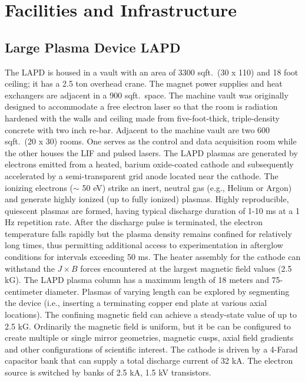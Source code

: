 \documentclass[11pt]{article}
\date{}
\title{}
\begin{document}
\section{Facilities and Infrastructure}

\subsection{Large Plasma Device {LAPD}}
The LAPD  is housed in a vault with an area of 3300 sqft.\ (30 x 110) and 18 foot ceiling; it has a 2.5 ton overhead crane.  The magnet power supplies and heat exchangers are adjacent in a 900 sqft.\ space.  The machine vault was originally designed to accommodate a free electron laser so that the room is radiation hardened with the walls and ceiling made from five-foot-thick, triple-density concrete with two inch re-bar.  Adjacent to the machine vault are two 600 sqft.\ (20 x 30) rooms.  One serves as the control and data acquisition room while the other houses the LIF and pulsed lasers.
	The LAPD plasmas are generated by electrons emitted from a heated, barium oxide-coated cathode and subsequently accelerated by a semi-transparent grid anode located near the cathode.  The ionizing electrons ($\sim$ 50 eV) strike an inert, neutral gas (e.g., Helium or Argon) and generate highly ionized (up to fully ionized) plasmas. Highly reproducible, quiescent plasmas are formed, having typical discharge duration of 1-10 ms at a 1 Hz repetition rate.  After the discharge pulse is terminated, the electron temperature falls rapidly but the plasma density remains confined for relatively long times, thus permitting additional access to experimentation in afterglow conditions for intervals exceeding 50 ms. The heater assembly for the cathode can withstand the $J\times B$ forces encountered at the largest magnetic field values (2.5 kG).
	The LAPD plasma column has a maximum length of 18 meters and 75-centimeter diameter.  Plasmas of varying length can be explored by segmenting the device (i.e., inserting a terminating copper end plate at various axial locations).  The confining magnetic field can achieve a steady-state value of up to 2.5  kG.  Ordinarily the magnetic field is uniform, but it be can be configured to create multiple or single mirror geometries, magnetic cusps, axial field gradients and other configurations of scientific interest.  The cathode is driven by a 4-Farad capacitor bank that can supply a total discharge current of 32 kA.  The electron source is switched by banks of 2.5 kA, 1.5 kV transistors. 
	
\end{document}
